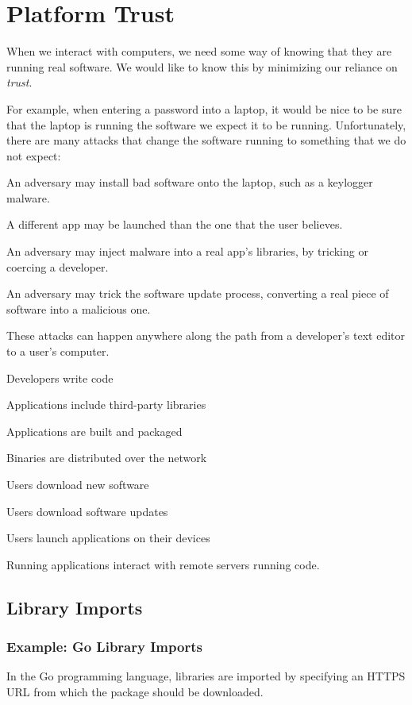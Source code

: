 \chapter{Platform Trust}
When we interact with computers, we need some way of knowing that they are running real software. We would like to know this by minimizing our reliance on \emph{trust}.

For example, when entering a password into a laptop, it would be nice to be sure that the laptop is running the software we expect it to be running.
Unfortunately, there are many attacks that change the software running to something that we do not expect:
\begin{compactitem}
	\item An adversary may install bad software onto the laptop, such as a keylogger malware.
	\item A different app may be launched than the one that the user believes.
	\item An adversary may inject malware into a real app's libraries, by tricking or coercing a developer.
	\item An adversary may trick the software update process, converting a real piece of software into a malicious one.
\end{compactitem}

These attacks can happen anywhere along the path from a developer's text editor to a user's computer.
\begin{compactenum}
	\item Developers write code
	\item Applications include third-party libraries
	\item Applications are built and packaged
	\item Binaries are distributed over the network
	\item Users download new software
	\item Users download software updates
	\item Users launch applications on their devices
	\item Running applications interact with remote servers running code.
\end{compactenum}

\section{Library Imports}

\subsection{Example: Go Library Imports}
In the Go programming language, libraries are imported by specifying an HTTPS URL from which the package should be downloaded.

